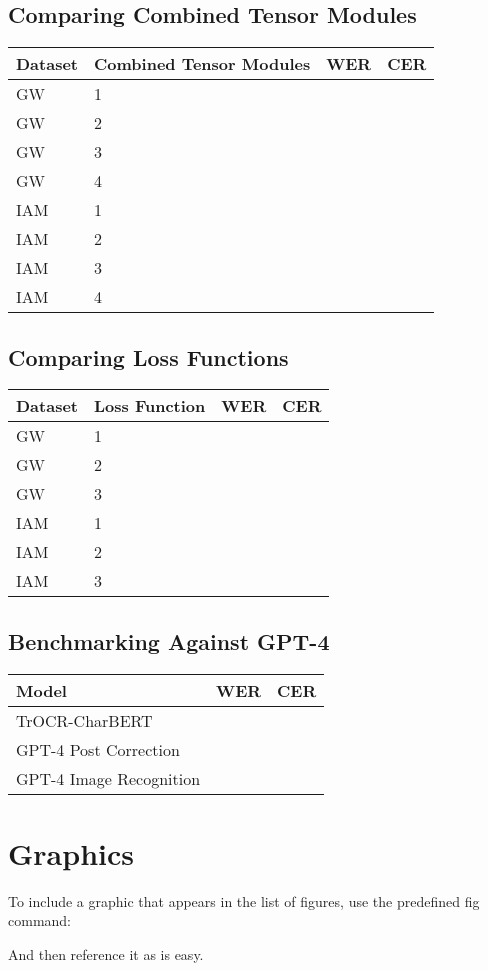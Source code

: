 \subsection{Comparing Combined Tensor Modules}
\label{subsec:5_comparing_combined_tensor_modules}
\begin{tabular}{l|l||r|r}
    Dataset	& Combined Tensor Modules	& WER	& CER		\\
    \hline
    \hline
    GW		& 1	& 	& 	\\
    GW		& 2		&  & 	\\
    GW		& 3	&  & 	\\
    GW		& 4	&  & 	\\
    \hline
    IAM		& 1	& 	& 	\\
    IAM		& 2		&  & 	\\
    IAM		& 3	&  & 	\\
    IAM		& 4	&  & 	\\
    \end{tabular}
\subsection{Comparing Loss Functions}
\label{subsec:5_comparing_loss_functions}
\begin{tabular}{l|l||r|r}
    Dataset	& Loss Function	& WER	& CER		\\
    \hline
    \hline
    GW		& 1	& 	& 	\\
    GW		& 2		&  & 	\\
    GW		& 3	&  & 	\\
    \hline
    IAM		& 1	& 	& 	\\
    IAM		& 2		&  & 	\\
    IAM		& 3	&  & 	\\
    \end{tabular}
\subsection{Benchmarking Against GPT-4}
\label{subsec:5_benchmarking_against_gpt-4}
\begin{tabular}{l||r|r}
    Model	& WER	& CER		\\
    \hline
    \hline
    TrOCR-CharBERT		& 	& 	\\
    GPT-4 Post Correction	&  & 	\\
    GPT-4 Image Recognition		&  & 	\\
    \end{tabular}
\section{Graphics}

To include a graphic that appears in the list of figures, use the predefined fig command:\\

And then reference it as  is easy.